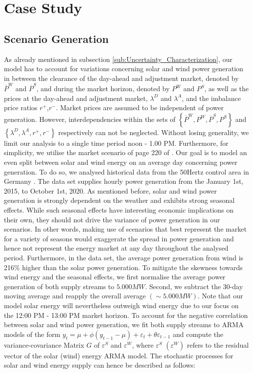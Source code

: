 
\section{Case Study}

\subsection{Scenario Generation}
As already mentioned in subsection \ref{sub:Uncertainty_Characterization}, our model has to account for variations concerning solar and wind power generation in between the clearance of the day-ahead and adjustment market, denoted by $\overline{P}^{W}$ and $\overline{P}^{S}$, and during the market horizon, denoted by ${P}^{W}$ and ${P}^{S}$, as well as the prices at the day-ahead and adjustment market, $\lambda^D$ and $\lambda^A$, and the imbalance price ratios $r^+$,$r^-$. Market prices are assumed to be independent of power generation. However, interdependencies within the sets of $\left\lbrace\overline{P}^{W},{P}^{W},\overline{P}^{S},{P}^{S}\right\rbrace$ and $\left\lbrace\lambda^D,\lambda^A,r^+,r^-\right\rbrace$ respectively can not be neglected. Without losing generality, we limit our analysis to a single time period noon - 1.00 PM. Furthermore, for simplicity, we utilise the market scenario of page 220 of \cite{Conejo10}. %
Our goal is to model an even split between solar and wind energy on an average day concerning power generation. To do so, we analysed historical data from the 50Hertz control area in Germany  \cite{url}. The data set supplies hourly power generation from the January 1st, 2015, to October 1st, 2020. As mentioned before, solar and wind power generation is strongly dependent on the weather and exhibits strong seasonal effects. While such seasonal effects have interesting economic implications on their own, they should not drive the variance of power generation in our scenarios. In other words, making use of scenarios that best represent the market for a variety of seasons would exaggerate the spread in power generation and hence not represent the energy market at any day throughout the analysed period. Furthermore, in the data set, the average power generation from wind is 216\% higher than the solar power generation. To mitigate the skewness towards wind energy and the seasonal effects, we first normalise the average power generation of both supply streams to $5.000 MW$. Second, we subtract the 30-day moving average and reapply the overall average $\left(\sim 5.000 MW\right)$. Note that our model solar energy will nevertheless outweigh wind energy due to our focus on the 12:00 PM - 13:00 PM market horizon. To account for the negative correlation between solar and wind power generation, we fit both supply streams to ARMA models of the form $y_t = \mu + \phi \left(y_{t-1}-\mu\right)+\varepsilon_t + \theta\varepsilon_{t-1}$ and compute the variance-covariance Matrix $G$ of $\varepsilon^S$ and $\varepsilon^W$, where $\varepsilon^S$ $\left(\varepsilon^W\right)$ refers to the residual vector of the solar (wind) energy ARMA model. The stochastic processes 
for solar and wind energy supply can hence be described as follows:


